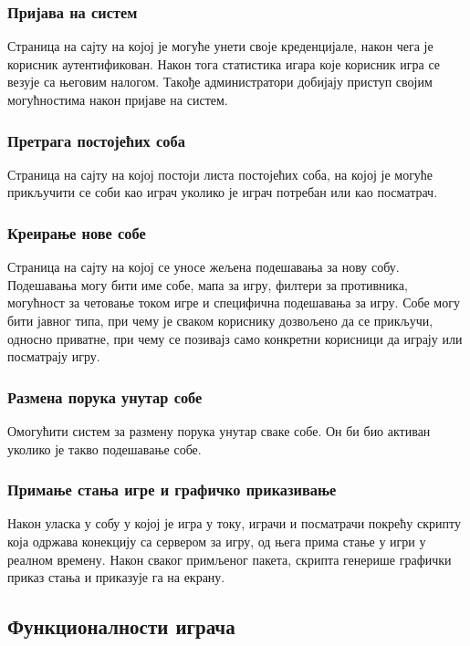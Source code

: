 \subsubsection{Пријава на систем}
Страница на сајту на којој је могуће унети своје креденцијале, након чега је корисник аутентификован. Након тога статистика игара које корисник игра се везује са његовим налогом. Такође администратори добијају приступ својим могућностима након пријаве на систем.

\subsubsection{Претрага постојећих соба}
Страница на сајту на којој постоји листа постојећих соба, на којој је могуће прикључити се соби као играч уколико је играч потребан или као посматрач.

\subsubsection{Креирање нове собе}
Страница на сајту на којој се уносе жељена подешавања за нову собу. Подешавања могу бити име собе, мапа за игру, филтери за противника, могућност за четовање током игре и специфична подешавања за игру. Собе могу бити јавног типа, при чему је сваком кориснику дозвољено да се прикључи, односно приватне, при чему се позивајз само конкретни корисници да играју или посматрају игру.

\subsubsection{Размена порука унутар собе}
Омогућити систем за размену порука унутар сваке собе. Он би био активан уколико је такво подешавање собе.

\subsubsection{Примање стања игре и графичко приказивање}
Након уласка у собу у којој је игра у току, играчи и посматрачи покрећу скрипту која одржава конекцију са сервером за игру, од њега прима стање у игри у реалном времену. Након сваког примљеног пакета, скрипта генерише графички приказ стања и приказује га на екрану.

\subsection{Функционалности играча}

